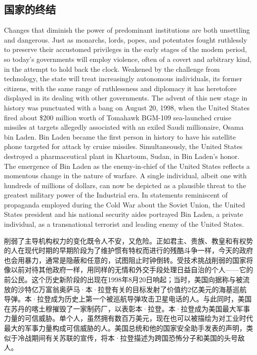 \begin{Parallel}{97mm}{45mm}
\section{国家的终结} 
  \ParallelLText
  {Changes that diminish the power of predominant institutions are both unsettling and dangerous. Just as monarchs, lords, popes, and potentates fought ruthlessly to preserve their accustomed privileges in the early stages of the modem period, so today's governments will employ violence, often of a covert and arbitrary kind, in the attempt to hold back the clock. Weakened by the challenge from technology, the state will treat increasingly autonomous individuals, its former citizens, with the same range of ruthlessness and diplomacy it has heretofore displayed in its dealing with other governments. The advent of this new stage in history was punctuated with a bang on August 20, 1998, when the United States fired about \$200 million worth of Tomahawk BGM-109 sea-launched cruise missiles at targets allegedly associated with an exiled Saudi millionaire, Osama bin Laden. Bin Laden became the first person in history to have his satellite phone targeted for attack by cruise missiles. Simultaneously, the United States destroyed a pharmaceutical plant in Khartoum, Sudan, in Bin Laden's honor. The emergence of Bin Laden as the enemy-in-chief of the United States reflects a momentous change in the nature of warfare. A single individual, albeit one with hundreds of millions of dollars, can now be depicted as a plausible threat to the greatest military power of the Industrial era. In statements reminiscent of propaganda employed during the Cold War about the Soviet Union, the United States president and his national security aides portrayed Bin Laden, a private individual, as a transnational terrorist and leading enemy of the United States. }
  
  \ParallelRText
  {\small 削弱了主导机构权力的变化既令人不安，又危险。正如君主、贵族、教皇和有权势的人在现代时期的早期阶段为了维护惯有特权而进行的残酷斗争一样，今天的政府也会用暴力，通常是隐蔽和任意的，试图阻止时钟倒转。受技术挑战削弱的国家将像以前对待其他政府一样，用同样的无情和外交手段处理日益自治的个人——它的前公民。这个历史新阶段的出现在1998年8月20日响起；当时，美国向据称与被流放的沙特亿万富翁奥萨马·本·拉登有关的目标发射了价值约2亿美元的海基巡航导弹。本·拉登成为历史上第一个被巡航导弹攻击卫星电话的人。与此同时，美国在苏丹的喀土穆摧毁了一家制药厂，以表彰本·拉登。本·拉登成为美国最大军事力量的可信威胁。单个人，虽然拥有数百万美元，现在也可以被描绘为对工业时代最大的军事力量构成可信威胁的人。美国总统和他的国家安全助手发表的声明，类似于冷战期间有关苏联的宣传，将本·拉登描述为跨国恐怖分子和美国的头号敌人。}



\end{Parallel}
